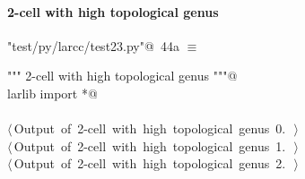 \documentclass[11pt,oneside]{article}    %
\begin{document}
\paragraph{2-cell with high topological genus}

\begin{flushleft} \small \label{scrap73}
\protect{}\verb@"test/py/larcc/test23.py"@\nobreak\ {\footnotesize 44a }$\equiv$
\vspace{-1ex}
\begin{list}{}{} \item
\mbox{}\verb@""" 2-cell with high topological genus """@\\
\mbox{}\verb@from larlib import *@\\
\mbox{}\verb@@\\
\mbox{}\verb@@\hbox{$\langle\,$Output of 2-cell with high topological genus 0.\nobreak\ {\footnotesize {}}$\,\rangle$}\verb@@\\
\mbox{}\verb@@\hbox{$\langle\,$Output of 2-cell with high topological genus 1.\nobreak\ {\footnotesize {}}$\,\rangle$}\verb@@\\
\mbox{}\verb@@\hbox{$\langle\,$Output of 2-cell with high topological genus 2.\nobreak\ {\footnotesize {}}$\,\rangle$}\verb@@\\
\mbox{}\verb@@{\NWsep}
\end{list}
\vspace{-2ex}
\end{flushleft}
\end{document}
